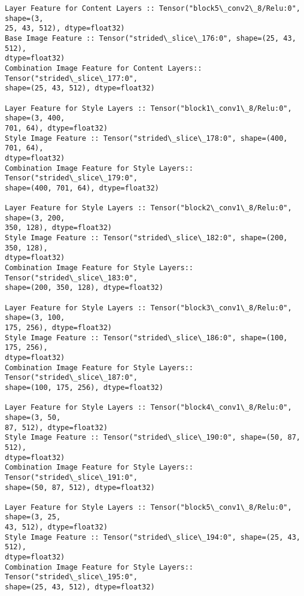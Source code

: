 \documentclass[11pt]{article}
\begin{document}
    \begin{Verbatim}[commandchars=\\\{\}]
Layer Feature for Content Layers :: Tensor("block5\_conv2\_8/Relu:0", shape=(3,
25, 43, 512), dtype=float32)
Base Image Feature :: Tensor("strided\_slice\_176:0", shape=(25, 43, 512),
dtype=float32)
Combination Image Feature for Content Layers:: Tensor("strided\_slice\_177:0",
shape=(25, 43, 512), dtype=float32)

Layer Feature for Style Layers :: Tensor("block1\_conv1\_8/Relu:0", shape=(3, 400,
701, 64), dtype=float32)
Style Image Feature :: Tensor("strided\_slice\_178:0", shape=(400, 701, 64),
dtype=float32)
Combination Image Feature for Style Layers:: Tensor("strided\_slice\_179:0",
shape=(400, 701, 64), dtype=float32)

Layer Feature for Style Layers :: Tensor("block2\_conv1\_8/Relu:0", shape=(3, 200,
350, 128), dtype=float32)
Style Image Feature :: Tensor("strided\_slice\_182:0", shape=(200, 350, 128),
dtype=float32)
Combination Image Feature for Style Layers:: Tensor("strided\_slice\_183:0",
shape=(200, 350, 128), dtype=float32)

Layer Feature for Style Layers :: Tensor("block3\_conv1\_8/Relu:0", shape=(3, 100,
175, 256), dtype=float32)
Style Image Feature :: Tensor("strided\_slice\_186:0", shape=(100, 175, 256),
dtype=float32)
Combination Image Feature for Style Layers:: Tensor("strided\_slice\_187:0",
shape=(100, 175, 256), dtype=float32)

Layer Feature for Style Layers :: Tensor("block4\_conv1\_8/Relu:0", shape=(3, 50,
87, 512), dtype=float32)
Style Image Feature :: Tensor("strided\_slice\_190:0", shape=(50, 87, 512),
dtype=float32)
Combination Image Feature for Style Layers:: Tensor("strided\_slice\_191:0",
shape=(50, 87, 512), dtype=float32)

Layer Feature for Style Layers :: Tensor("block5\_conv1\_8/Relu:0", shape=(3, 25,
43, 512), dtype=float32)
Style Image Feature :: Tensor("strided\_slice\_194:0", shape=(25, 43, 512),
dtype=float32)
Combination Image Feature for Style Layers:: Tensor("strided\_slice\_195:0",
shape=(25, 43, 512), dtype=float32)

    \end{Verbatim}
\end{document}
